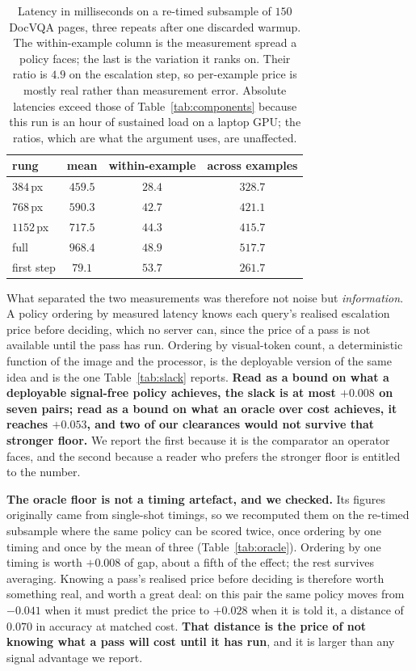 \documentclass[10pt,twocolumn]{article}
\theoremstyle{plain}
\begin{document}
\begin{table}[t]
\centering\small
\setlength{\tabcolsep}{5pt}
\begin{tabular}{lccc}
\toprule
rung & mean & within-example & across examples \\
\midrule
$384$\,px & $459.5$ & $28.4$ & $328.7$ \\
$768$\,px & $590.3$ & $42.7$ & $421.1$ \\
$1152$\,px & $717.5$ & $44.3$ & $415.7$ \\
full & $968.4$ & $48.9$ & $517.7$ \\
\midrule
first step & $79.1$ & $53.7$ & $261.7$ \\
\bottomrule
\end{tabular}
\caption{Latency in milliseconds on a re-timed subsample of $150$ DocVQA
pages, three repeats after one discarded warmup. The within-example column is
the measurement spread a policy faces; the last is the variation it ranks on.
Their ratio is $4.9$ on the escalation step, so per-example price is mostly real
rather than measurement error. Absolute latencies exceed those of
Table~\ref{tab:components} because this run is an hour of sustained load on a
laptop GPU; the ratios, which are what the argument uses, are unaffected.}
\label{tab:timing}
\end{table}

What separated the two measurements was therefore not noise but
\emph{information}. A policy ordering by measured latency knows each query's
realised escalation price before deciding, which no server can, since the price
of a pass is not available until the pass has run. Ordering by visual-token
count, a deterministic function of the image and the processor, is the
deployable version of the same idea and is the one Table~\ref{tab:slack}
reports. \textbf{Read as a bound on what a deployable signal-free policy
achieves, the slack is at most $+0.008$ on seven pairs; read as a bound on what
an oracle over cost achieves, it reaches $+0.053$, and two of our clearances
would not survive that stronger floor.} We report the first because it is the
comparator an operator faces, and the second because a reader who prefers the
stronger floor is entitled to the number.

\textbf{The oracle floor is not a timing artefact, and we checked.} Its figures
originally came from single-shot timings, so we recomputed them on the re-timed
subsample where the same policy can be scored twice, once ordering by one
timing and once by the mean of three (Table~\ref{tab:oracle}). Ordering by one
timing is worth $+0.008$ of gap, about a fifth of the effect; the rest survives
averaging. Knowing a pass's realised price before deciding is therefore worth
something real, and worth a great deal: on this pair the same policy moves from
$-0.041$ when it must predict the price to $+0.028$ when it is told it, a
distance of $0.070$ in accuracy at matched cost. \textbf{That distance is the
price of not knowing what a pass will cost until it has run}, and it is larger
than any signal advantage we report.
\end{document}
